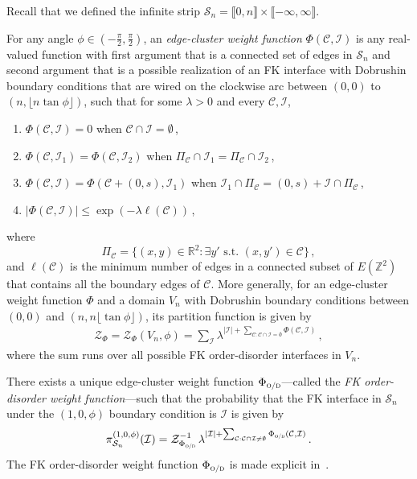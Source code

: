 \documentclass[reqno,11pt]{amsart}
\numberwithin{equation}{section}
\theoremstyle{definition}{
\newtheorem{example}[theorem]{Example}
\newtheorem{definition}[theorem]{Definition}
\newtheorem*{definition*}{Definition}
\newtheorem{problem}[theorem]{Problem}
\newtheorem{question}[theorem]{Question}
\newtheorem{remark}[theorem]{Remark}
}
\newcommand{\Z}{\mathbb Z}
\newcommand{\cC}{\ensuremath{\mathcal C}}
\newcommand{\cI}{\ensuremath{\mathcal I}}
\newcommand{\cS}{\ensuremath{\mathcal S}}
\newcommand{\cZ}{\ensuremath{\mathcal Z}}
\newcommand{\llb }{\llbracket}
\newcommand{\rrb }{\rrbracket}
\begin{document}
Recall that we defined the infinite strip $\mathcal S_n = \llb 0,n\rrb \times \llb -\infty,\infty\rrb$. 

\begin{definition}For any angle $\phi\in (-\frac \pi 2, \frac \pi 2 )$, an \emph{edge-cluster weight function} $\Phi(\mathcal C,\mathcal I)$ is any real-valued function with first argument that is a connected set of edges in $\mathcal S_n$ and second argument that is a possible realization of an FK interface with Dobrushin boundary conditions that are wired on the clockwise arc between  $(0,0)$ to $(n,\lfloor n\tan \phi \rfloor)$, such that for some $\lambda>0$ and every $\mathcal C, \mathcal I$, 
\begin{enumerate}
\item $\Phi(\mathcal C,\mathcal I)=0$ when $\mathcal C\cap \mathcal I=\emptyset$\,,
\item $\Phi(\mathcal C,\mathcal I_1)=\Phi(\mathcal C,\mathcal I_2)$ when $\Pi_{\mathcal C} \cap \mathcal I_1=\Pi_{\mathcal C}\cap \mathcal I_2$\,,
\item $\Phi(\mathcal C,\mathcal I)=\Phi(\cC+(0,s),\mathcal I_1)$ when $\mathcal I_1\cap \Pi_{\mathcal C}=(0,s)+\mathcal I\cap \Pi_{\mathcal C}$\,,
\item $|\Phi(\mathcal C,\mathcal I)|\leq \exp(-\lambda  \ell(\mathcal C))$\,,
\end{enumerate}
 where $$\Pi_{\mathcal C}=\{(x,y)\in \mathbb R^2:\exists y' \mbox{ s.t.\ }(x,y')\in \mathcal C\}\,,$$ and $\ell(\mathcal C)$ is the minimum number of edges in a connected subset of $E(\Z^2)$ that contains all the boundary edges of $\mathcal C$. 
More generally, for an edge-cluster weight function $\Phi$ and a domain $V_n$ with Dobrushin boundary conditions between $(0,0)$ and $(n,n\lfloor \tan \phi \rfloor)$, its partition function is given by
\begin{align}\label{eq:cluster-weight-function}
\cZ_\Phi = \mathcal Z_\Phi(V_n, \phi) = \sum_{\mathcal I} \lambda^{|\mathcal I|+\sum_{\mathcal C: \mathcal C\cap \mathcal I = \emptyset} \Phi(\mathcal C, \mathcal I)}\,,
\end{align}
where the sum runs over all possible FK order-disorder interfaces in $V_n$. 

There exists a unique edge-cluster weight function $\Phi_{\textsc{o/d}}$---called the \emph{FK order-disorder weight function}---such that the probability that the FK interface in $\cS_n$ under the $(1,0,\phi)$ boundary condition is $\cI$ is given by
\[ \pi_{\cS_n}^{(1,0,\phi)}(\cI) = \cZ_{\Phi_{\textsc{o/d}}}^{-1}\, \lambda^{|\mathcal I| + \sum_{\mathcal C:\mathcal C\cap \mathcal I \neq \emptyset} \Phi_{\textsc{o/d}}(\mathcal C,\mathcal I)}\,.\]
The FK order-disorder weight function $\Phi_{\textsc{o/d}}$ is made explicit in~\cite[Proposition~5]{MMRS91}. 
\end{definition}
\end{document}
